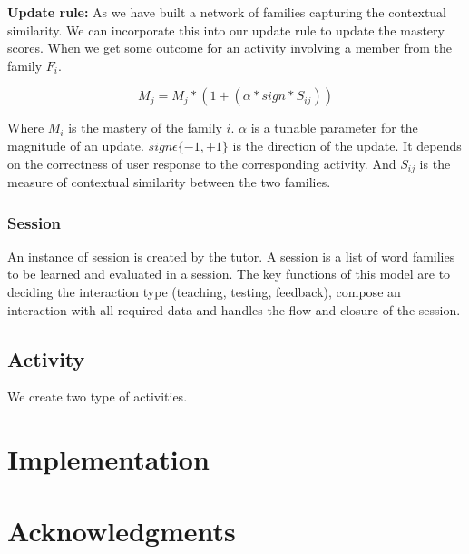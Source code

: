 \documentclass[11pt,a4paper]{article}
\begin{document}
\textbf{Update rule:} As we have built a network of families capturing the
contextual similarity. We can incorporate this into our update rule to update
the mastery scores. When we get some outcome for an activity involving a member
from the family ${F_i}$.

\begin{equation}
  M_j = M_j * (1 + (\alpha * sign * S_{ij}))
\end{equation}

Where ${M_i}$ is the mastery of the family ${i}$. ${\alpha}$ is a tunable parameter
for the magnitude of an update. ${sign \epsilon \{-1, +1\}}$ is the direction 
of the update. It depends on the correctness of user response to the corresponding
activity. And ${S_{ij}}$ is the measure of contextual similarity between the two
families.

\subsubsection{Session}
An instance of session is created by the tutor. A session is a list of word
families to be learned and evaluated in a session. The key functions of this
model are to deciding the interaction type (teaching, testing, feedback), 
compose an interaction with all required data and handles the flow and closure
of the session.

\subsection{Activity}
We create two type of activities. 

\section{Implementation}

\section*{Acknowledgments}

%
%


\end{document}
